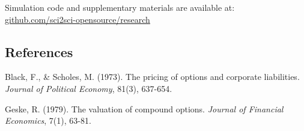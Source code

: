\documentclass[
  11pt,
  openany]{article}
\begin{document}
Simulation code and supplementary materials are available at:
\href{https://github.com/sci2sci-opensource/research/tree/master/critical-volatility-and-v*}{github.com/sci2sci-opensource/research}

\subsection{References}\label{references}

Black, F., \& Scholes, M. (1973). The pricing of options and corporate
liabilities. \emph{Journal of Political Economy}, 81(3), 637-654.

Geske, R. (1979). The valuation of compound options. \emph{Journal of
Financial Economics}, 7(1), 63-81.
\end{document}
